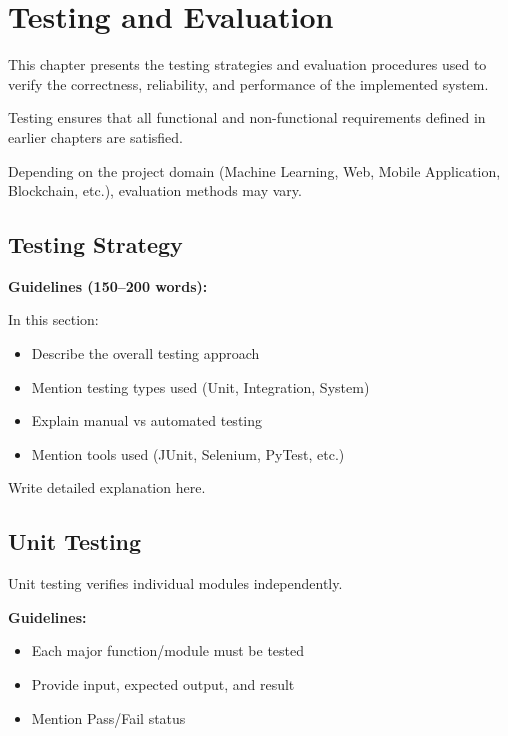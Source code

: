 
\chapter{Testing and Evaluation}

This chapter presents the testing strategies and evaluation 
procedures used to verify the correctness, reliability, and 
performance of the implemented system.

Testing ensures that all functional and non-functional 
requirements defined in earlier chapters are satisfied.

Depending on the project domain (Machine Learning, Web, 
Mobile Application, Blockchain, etc.), evaluation methods 
may vary.


\section{Testing Strategy}

\textbf{Guidelines (150–200 words):}

In this section:
\begin{itemize}
    \item Describe the overall testing approach
    \item Mention testing types used (Unit, Integration, System)
    \item Explain manual vs automated testing
    \item Mention tools used (JUnit, Selenium, PyTest, etc.)
\end{itemize}

Write detailed explanation here.


\section{Unit Testing}

Unit testing verifies individual modules independently.

\textbf{Guidelines:}
\begin{itemize}
    \item Each major function/module must be tested
    \item Provide input, expected output, and result
    \item Mention Pass/Fail status
\end{itemize}


